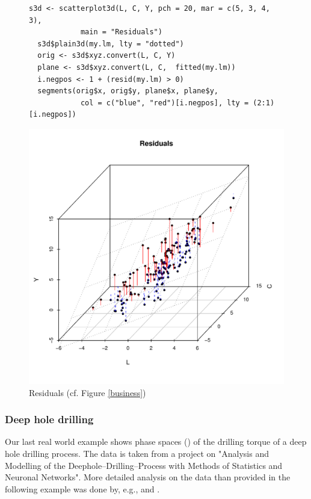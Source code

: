 \begin{figure}[htb!]
\small
\begin{Verbatim}[frame=single]
  s3d <- scatterplot3d(L, C, Y, pch = 20, mar = c(5, 3, 4, 3),
            main = "Residuals")
  s3d$plain3d(my.lm, lty = "dotted")
  orig <- s3d$xyz.convert(L, C, Y)
  plane <- s3d$xyz.convert(L, C,  fitted(my.lm))
  i.negpos <- 1 + (resid(my.lm) > 0)
  segments(orig$x, orig$y, plane$x, plane$y,
            col = c("blue", "red")[i.negpos], lty = (2:1)[i.negpos])
\end{Verbatim}
\normalsize
\begin{center}\includegraphics[width=13cm]{residuals}\end{center}
\vspace*{-5mm}\caption{Residuals (cf. Figure \ref{business})\label{residuals}}
\end{figure}


\clearpage
\subsubsection{Deep hole drilling}
Our last real world example shows phase spaces (\cite{tong93}) of the drilling torque of a deep hole drilling process.
The data is taken from a project on
"Analysis and Modelling of the Deephole--Drilling--Process with Methods of Statistics and Neuronal Networks".
More detailed analysis on the data than provided in the following example was done by,
e.g.,  and .

